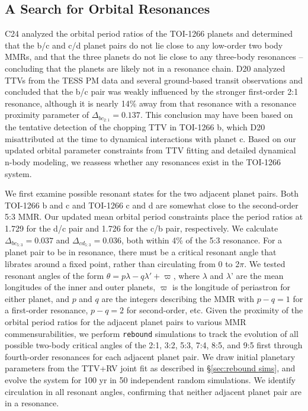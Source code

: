 \documentclass[twocolumn]{aastex631}
\begin{document}
\subsection{A Search for Orbital Resonances}

C24 analyzed the orbital period ratios of the TOI-1266 planets and determined that the b/c and c/d planet pairs do not lie close to any low-order two body MMRs, and that the three planets do not lie close to any three-body resonances -- concluding that the planets are likely not in a resonance chain. D20 analyzed TTVs from the TESS PM data and several ground-based transit observations and concluded that the b/c pair was weakly influenced by the stronger first-order 2:1 resonance, although it is nearly 14\% away from that resonance with a resonance proximity parameter \citep{Lithwick_2012} of $\Delta_{bc_{2:1}} = 0.137$. This conclusion may have been based on the tentative detection of the chopping TTV in TOI-1266 b, which D20 misattributed at the time to dynamical interactions with planet c. Based on our updated orbital parameter constraints from TTV fitting and detailed dynamical n-body modeling, we reassess whether any resonances exist in the TOI-1266 system. 

We first examine possible resonant states for the two adjacent planet pairs. Both TOI-1266 b and c and TOI-1266 c and d are somewhat close to the second-order 5:3 MMR. Our updated mean orbital period constraints place the period ratios at 1.729 for the d/c pair and 1.726 for the c/b pair, respectively.  We calculate $\Delta_{bc_{5:3}} = 0.037$ and $\Delta_{cd_{5:3}} = 0.036$, both within 4\% of the 5:3 resonance. For a planet pair to be in resonance, there must be a critical resonant angle that librates around a fixed point, rather than circulating from 0 to 2$\pi$. We tested resonant angles of the form $\theta = p\lambda - q\lambda' + \varpi$, where $\lambda$ and $\lambda$' are the mean longitudes of the inner and outer planets, $\varpi$ is the longitude of periastron for either planet, and $p$ and $q$ are the integers describing the MMR with $p - q = 1$ for a first-order resonance, $p - q = 2$ for second-order, etc. Given the proximity of the orbital period ratios for the adjacent planet pairs to various MMR commensurabilities, we perform \texttt{rebound} simulations to track the evolution of all possible two-body critical angles of the 2:1, 3:2, 5:3, 7:4, 8:5, and 9:5 first through fourth-order resonances for each adjacent planet pair. We draw initial planetary parameters from the TTV+RV joint fit as described in \S\ref{sec:rebound sims}, and evolve the system for 100 yr in 50 independent random simulations. We identify circulation in all resonant angles, confirming that neither adjacent planet pair are in a resonance.
\end{document}
